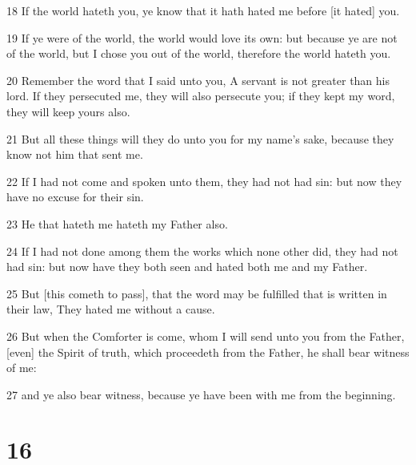 \par 18 If the world hateth you, ye know that it hath hated me before [it hated] you.
\par 19 If ye were of the world, the world would love its own: but because ye are not of the world, but I chose you out of the world, therefore the world hateth you.
\par 20 Remember the word that I said unto you, A servant is not greater than his lord. If they persecuted me, they will also persecute you; if they kept my word, they will keep yours also.
\par 21 But all these things will they do unto you for my name's sake, because they know not him that sent me.
\par 22 If I had not come and spoken unto them, they had not had sin: but now they have no excuse for their sin.
\par 23 He that hateth me hateth my Father also.
\par 24 If I had not done among them the works which none other did, they had not had sin: but now have they both seen and hated both me and my Father.
\par 25 But [this cometh to pass], that the word may be fulfilled that is written in their law, They hated me without a cause.
\par 26 But when the Comforter is come, whom I will send unto you from the Father, [even] the Spirit of truth, which proceedeth from the Father, he shall bear witness of me:
\par 27 and ye also bear witness, because ye have been with me from the beginning.

\chapter{16}

